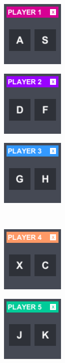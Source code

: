 \begin{figure}[h!] 
	\centering
	\begin{subfigure}{0.195\textwidth}
		\centering
		\includegraphics[scale=1, frame]{gui-imgs/player1enabledpanel}
	\end{subfigure}
	\begin{subfigure}{0.195\textwidth}
		\centering
		\includegraphics[scale=1, frame]{gui-imgs/player2enabledpanel}
	\end{subfigure}
	\begin{subfigure}{0.195\textwidth}
		\centering
		\includegraphics[scale=1, frame]{gui-imgs/player3enabledpanel}
	\end{subfigure} \\
	\begin{subfigure}{0.195\textwidth}
		\centering
		\includegraphics[scale=1, frame]{gui-imgs/player4enabledpanel}
	\end{subfigure}
	\begin{subfigure}{0.195\textwidth}
		\centering
		\includegraphics[scale=1, frame]{gui-imgs/player5enabledpanel}

\end{subfigure}
\end{figure}
